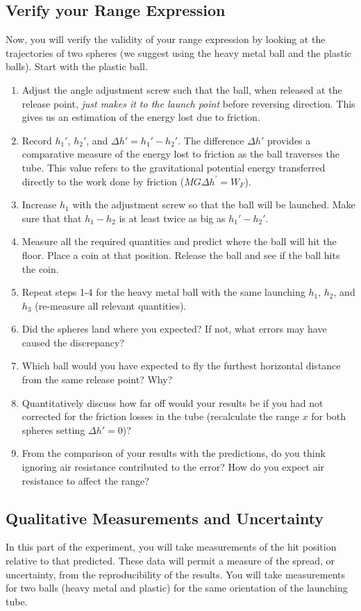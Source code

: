 \subsection{Verify your Range Expression}
Now, you will verify the validity of your range expression by looking at the trajectories of two spheres (we suggest using the heavy metal ball and the plastic balls). Start with the plastic ball.
\begin{enumerate}
\item Adjust the angle adjustment screw such that the ball, when released at the release point, {\it{just makes it to the launch point}} before reversing direction. This gives us an estimation of the energy lost due to friction.
\item Record $h_1'$, $h_2'$, and $\Delta h' = h_1' - h_2'$. The difference $\Delta h'$ provides a comparative measure of the energy lost to friction as the ball traverses the tube. This value refers to the gravitational potential energy transferred directly to the work done by friction ($ MG\Delta h^{\prime}=W_{F}$).
\item Increase $h_1$ with the adjustment screw so that the ball will be launched. Make sure that that $h_1-h_2$ is at least twice as big as $h_1'-h_2'$.
\item Measure all the required quantities and predict where the ball will hit the floor. Place a coin at that position. Release the ball and see if the ball hits the coin.

\item Repeat steps 1-4 for the heavy metal ball with the same launching $h_1$, $h_2$, and $h_3$ (re-measure all relevant quantities).
\item Did the spheres land where you expected? If not, what errors may have caused the discrepancy?
\item Which ball would you have expected to fly the furthest horizontal distance from the same release point? Why?
\item Quantitatively discuss how far off would your results be if you had not corrected for the friction losses in the tube (recalculate the range $x$ for both spheres setting $\Delta h'=0$)?
\item From the comparison of your results with the predictions, do you think ignoring air resistance contributed to the error? How do you expect air resistance to affect the range?
\end{enumerate}

\subsection{Qualitative Measurements and Uncertainty}
In this part of the experiment, you will take measurements of the hit position relative to that predicted. These data will permit a measure of the spread, or uncertainty, from the reproducibility of the results. You will take measurements for two balls (heavy metal and plastic) for the same orientation of the launching tube.\myskip

